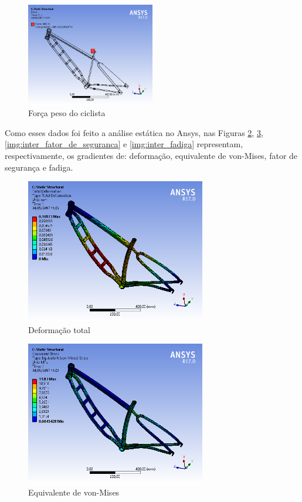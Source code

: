 	\newpage
	\begin{figure}[!htb]
		\centering
		\includegraphics[width=0.5\textwidth]{inter_F900.png}
		\caption{Força peso do ciclista}
		\label{img:inter_F900}
	\end{figure}
	
	Como esses dados foi feito a análise estática no Ansys, nas Figuras \ref{img:inter_deformacao_total}, \ref{img:inter_von-Mises}, \ref{img:inter_fator_de_seguranca} e \ref{img:inter_fadiga} representam, respectivamente, os gradientes de: deformação, equivalente de von-Mises, fator de segurança e fadiga.
	
	\begin{figure}[!htb]
		\centering
		\includegraphics[width=0.7\textwidth]{inter_deformacao_total.png}
		\caption{Deformação total}
		\label{img:inter_deformacao_total}
	\end{figure}
	
	\newpage
	\begin{figure}[!htb]
		\centering
		\includegraphics[width=0.7\textwidth]{inter_von-Mises.png}
		\caption{Equivalente de von-Mises}
		\label{img:inter_von-Mises}
	\end{figure}
	
